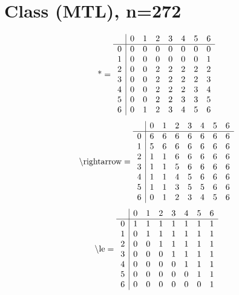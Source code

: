 \documentclass[11pt]{article}
\begin{document}
\section{Class (MTL), n=272}
\[\text{*} = 
\begin{array}{r | r r r r r r r}
 & 0 & 1 & 2 & 3 & 4 & 5 & 6 \\ \hline
0 & 0 & 0 & 0 & 0 & 0 & 0 & 0 \\
1 & 0 & 0 & 0 & 0 & 0 & 0 & 1 \\
2 & 0 & 0 & 2 & 2 & 2 & 2 & 2 \\
3 & 0 & 0 & 2 & 2 & 2 & 2 & 3 \\
4 & 0 & 0 & 2 & 2 & 2 & 3 & 4 \\
5 & 0 & 0 & 2 & 2 & 3 & 3 & 5 \\
6 & 0 & 1 & 2 & 3 & 4 & 5 & 6 \\
\end{array}
\]
\[\text{\textbackslash rightarrow} = 
\begin{array}{r | r r r r r r r}
 & 0 & 1 & 2 & 3 & 4 & 5 & 6 \\ \hline
0 & 6 & 6 & 6 & 6 & 6 & 6 & 6 \\
1 & 5 & 6 & 6 & 6 & 6 & 6 & 6 \\
2 & 1 & 1 & 6 & 6 & 6 & 6 & 6 \\
3 & 1 & 1 & 5 & 6 & 6 & 6 & 6 \\
4 & 1 & 1 & 4 & 5 & 6 & 6 & 6 \\
5 & 1 & 1 & 3 & 5 & 5 & 6 & 6 \\
6 & 0 & 1 & 2 & 3 & 4 & 5 & 6 \\
\end{array}
\]
\[\text{\textbackslash le} = 
\begin{array}{r | r r r r r r r}
 & 0 & 1 & 2 & 3 & 4 & 5 & 6 \\ \hline
0 & 1 & 1 & 1 & 1 & 1 & 1 & 1 \\
1 & 0 & 1 & 1 & 1 & 1 & 1 & 1 \\
2 & 0 & 0 & 1 & 1 & 1 & 1 & 1 \\
3 & 0 & 0 & 0 & 1 & 1 & 1 & 1 \\
4 & 0 & 0 & 0 & 0 & 1 & 1 & 1 \\
5 & 0 & 0 & 0 & 0 & 0 & 1 & 1 \\
6 & 0 & 0 & 0 & 0 & 0 & 0 & 1 \\
\end{array}
\]
\end{document}
